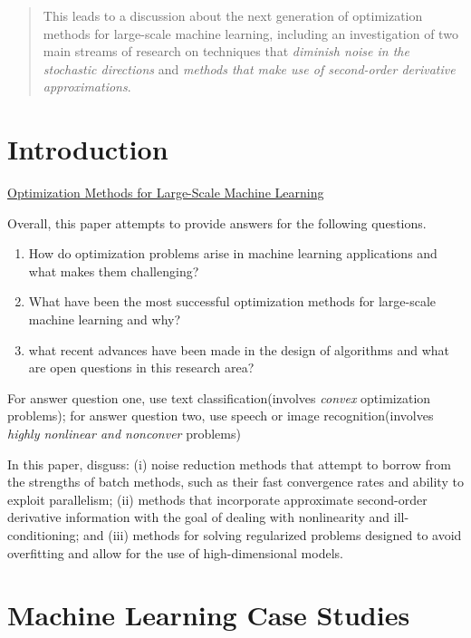 \begin{abstract}
  This leads to a discussion about the next generation of optimization methods for large-scale machine learning, including an investigation of two main streams of research on techniques that \emph{diminish noise in the stochastic directions} and \emph{methods that make use of second-order derivative approximations}.
\end{abstract}

\tableofcontents

\section{Introduction}
\href{https://arxiv.org/abs/1606.04838}{Optimization Methods for Large-Scale Machine Learning}

Overall, this paper attempts to provide answers for the following questions.

\begin{enumerate}
  \item{How do optimization problems arise in machine learning applications and
      what makes them challenging?}
  \item{What have been the most successful optimization methods for large-scale
      machine learning and why?}
  \item{what recent advances have been made in the design of algorithms and what
      are open questions in this research area?}
\end{enumerate}

For answer question one, use text classification(involves \emph{convex}
optimization problems); for answer question two, use speech or image
recognition(involves \emph{highly nonlinear and nonconver} problems)

In this paper, disguss: (i) noise reduction methods that attempt to borrow from
the strengths of batch methods, such as their fast convergence rates and ability
to exploit parallelism; (ii) methods that incorporate approximate second-order
derivative information with the goal of dealing with nonlinearity and
ill-conditioning; and (iii) methods for solving regularized problems designed to
avoid overfitting and allow for the use of high-dimensional models.

\section{Machine Learning Case Studies}
\setcounter{equation}{0}
\setcounter{theorem}{0}
\setcounter{algorithm}{0}
\setcounter{figure}{0}
\setcounter{table}{0}

